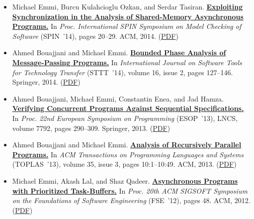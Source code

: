 \documentclass{article}
\begin{document}
\begin{itemize}[leftmargin=0cm,label={}]
    \item Michael Emmi, Burcu Kulahcioglu Ozkan, and Serdar Tasiran. {\bf\href{%
    http://doi.acm.org/10.1145/2632362.2632370}{%
    Exploiting Synchronization in the Analysis of Shared-Memory Asynchronous Programs.}} In \emph{ Proc. International SPIN Symposium on Model Checking of Software } (SPIN ’14), pages 20–29. ACM, 2014. (\href{https://michael-emmi.github.io/https://github.com/michael-emmi/research-papers/raw/master/conf-spin-EmmiOT14.pdf}{PDF})


    \item Ahmed Bouajjani and Michael Emmi. {\bf\href{%
    http://dx.doi.org/10.1007/s10009-013-0276-z}{%
    Bounded Phase Analysis of Message-Passing Programs.}} In \emph{ International Journal on Software Tools for Technology Transfer } (STTT ’14), volume 16, issue 2, pages 127–146. Springer, 2014. (\href{https://michael-emmi.github.io/https://github.com/michael-emmi/research-papers/raw/master/journals-sttt-BouajjaniE14.pdf}{PDF})


    \item Ahmed Bouajjani, Michael Emmi, Constantin Enea, and Jad Hamza. {\bf\href{%
    http://dx.doi.org/10.1007/978-3-642-37036-6_17}{%
    Verifying Concurrent Programs Against Sequential Specifications.}} In \emph{ Proc. 22nd European Symposium on Programming } (ESOP ’13), LNCS, volume 7792, pages 290–309. Springer, 2013. (\href{https://michael-emmi.github.io/https://github.com/michael-emmi/research-papers/raw/master/conf-esop-BouajjaniEEH13.pdf}{PDF})


    \item Ahmed Bouajjani and Michael Emmi. {\bf\href{%
    http://doi.acm.org/10.1145/2518188}{%
    Analysis of Recursively Parallel Programs.}} In \emph{ ACM Transactions on Programming Languages and Systems } (TOPLAS ’13), volume 35, issue 3, pages 10:1–10:49. ACM, 2013. (\href{https://michael-emmi.github.io/https://github.com/michael-emmi/research-papers/raw/master/journals-toplas-BouajjaniE13.pdf}{PDF})


    \item Michael Emmi, Akash Lal, and Shaz Qadeer. {\bf\href{%
    http://doi.acm.org/10.1145/2393596.2393652}{%
    Asynchronous Programs with Prioritized Task-Buffers.}} In \emph{ Proc. 20th ACM SIGSOFT Symposium on the Foundations of Software Engineering } (FSE ’12), pages 48. ACM, 2012. (\href{https://michael-emmi.github.io/https://github.com/michael-emmi/research-papers/raw/master/conf-fse-EmmiLQ12.pdf}{PDF})



\end{itemize}
\end{document}
